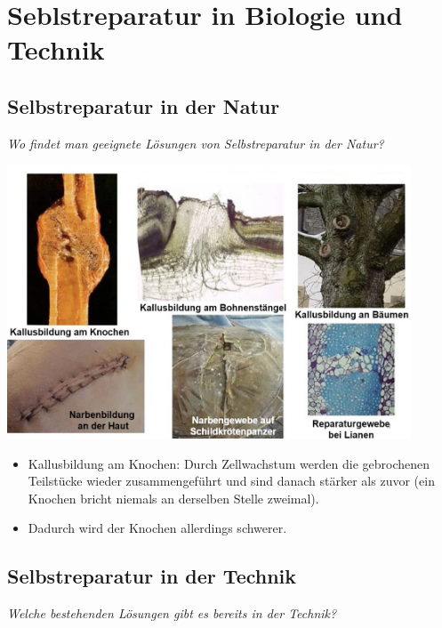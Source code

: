 \section{Seblstreparatur in Biologie und Technik}

\subsection{Selbstreparatur in der Natur}

\textit{Wo findet man geeignete Lösungen von Selbstreparatur in der Natur?}

\begin{center}
    \includegraphics[width=12cm]{lec5/figures/selbstheilung-natur.png}
\end{center}

\begin{itemize}
    \item Kallusbildung am Knochen: Durch Zellwachstum werden die gebrochenen Teilstücke wieder zusammengeführt und sind danach stärker als zuvor (ein Knochen bricht niemals an derselben Stelle zweimal). \item Dadurch wird der Knochen allerdings schwerer.
\end{itemize}

\subsection{Selbstreparatur in der Technik}

\textit{Welche bestehenden Lösungen gibt es bereits in der Technik?}

